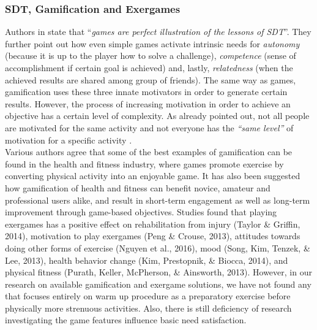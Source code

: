 \subsubsection{SDT, Gamification and Exergames}
Authors in \cite{werbach2012win} state that ``\textit{games are perfect illustration of the lessons of SDT}''. They further point out how even simple games activate intrinsic needs for \textit{autonomy} (because it is up to the player how to solve a challenge), \textit{competence} (sense of accomplishment if certain goal is achieved) and, lastly, \textit{relatedness} (when the achieved results are shared among group of friends). The same way as games, gamification uses these three innate motivators in order to generate certain results. However, the process of increasing motivation in order to achieve an objective has a certain level of complexity. As already pointed out, not all people are motivated for the same activity and not everyone has the \textit{``same level''} of motivation for a specific activity \cite{ryan2000intrinsic}.\\ %
Various authors agree that some of the best examples of gamification can be found in the health and fitness industry, where games promote exercise by converting physical activity into an enjoyable game. It has also been suggested how gamification of health and fitness can benefit novice, amateur and professional users alike, and result in short-term engagement as well as long-term improvement through game-based objectives. 
Studies found that playing exergames has a positive effect on rehabilitation from
injury (Taylor \& Griffin, 2014), motivation to play exergames (Peng
\& Crouse, 2013), attitudes towards doing other forms of exercise
(Nguyen et al., 2016), mood (Song, Kim, Tenzek, \& Lee, 2013), health
behavior change (Kim, Prestopnik, \& Biocca, 2014), and physical
fitness (Purath, Keller, McPherson, \& Ainsworth, 2013). However, in our research on available gamification and exergame solutions, we have not found any that focuses entirely on warm up procedure as a preparatory exercise before physically more strenuous activities. Also, there is still deficiency of research investigating the game features influence basic need satisfaction.\\
